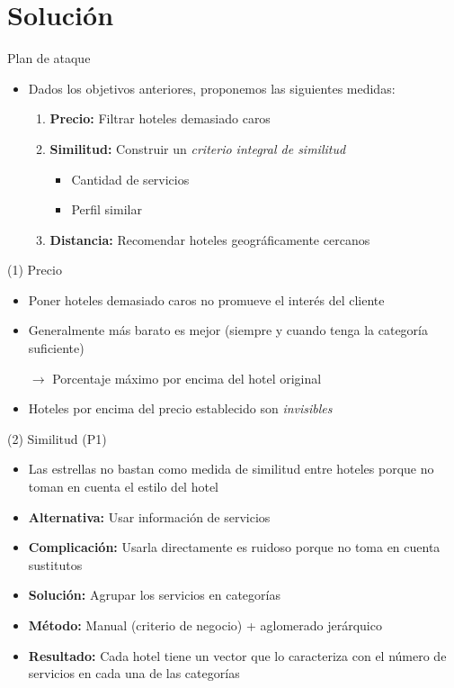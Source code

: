 \documentclass{beamer}
\begin{document}
\section{Solución}

\begin{frame}{Plan de ataque}
	\begin{itemize}
		\item Dados los objetivos anteriores, proponemos las siguientes medidas:
		\begin{enumerate}%
		\item \textbf{Precio:} Filtrar hoteles demasiado caros
		\item \textbf{Similitud:} Construir un \textit{criterio integral de similitud}
		\begin{itemize}
			\item Cantidad de servicios
			\item Perfil similar
		\end{itemize}
		\item \textbf{Distancia:} Recomendar hoteles geográficamente cercanos
	\end{enumerate}
	\end{itemize}
\end{frame}

\begin{frame}{(1) Precio}
	\begin{itemize}%
		\item Poner hoteles demasiado caros no promueve el interés del cliente
		\item Generalmente más barato es mejor (siempre y cuando tenga la categoría suficiente)
		\item[$\mathbf{\rightarrow}$] Porcentaje máximo por encima del hotel original
		\item Hoteles por encima del precio establecido son \textit{invisibles}
	\end{itemize}
\end{frame}

\begin{frame}{(2) Similitud (P1)}
	\begin{itemize}%
		\item Las estrellas no bastan como medida de similitud entre hoteles porque no toman en cuenta el estilo del hotel
		\item \textbf{Alternativa:} Usar información de servicios
		\item \textbf{Complicación:} Usarla directamente es ruidoso porque no toma en cuenta sustitutos
		\item \textbf{Solución:} Agrupar los servicios en categorías
		\item \textbf{Método:} Manual (criterio de negocio) + aglomerado jerárquico
		\item \textbf{Resultado:} Cada hotel tiene un vector que lo caracteriza con el número de servicios en cada una de las categorías
	\end{itemize}
\end{frame}
\end{document}
